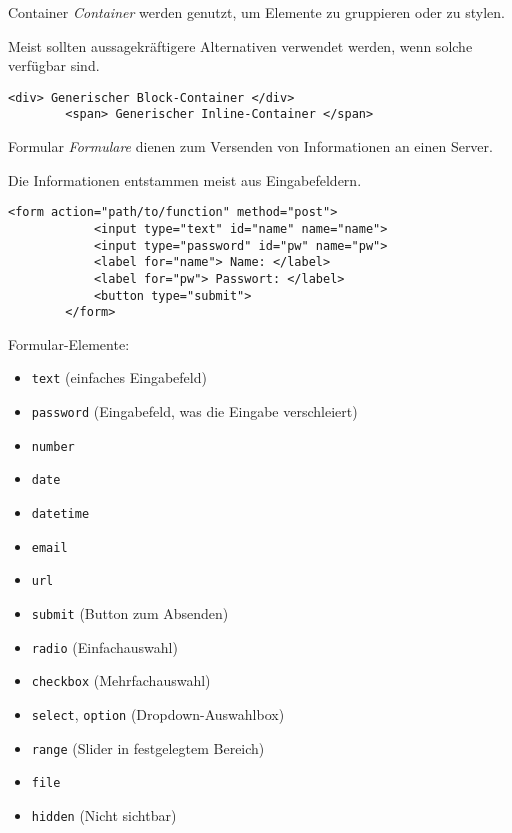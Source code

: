 \begin{bonus}{Container}
    \emph{Container} werden genutzt, um Elemente zu gruppieren oder zu stylen.

    Meist sollten aussagekräftigere Alternativen verwendet werden, wenn solche verfügbar sind.

    \begin{lstlisting}[language=html5]
        <div> Generischer Block-Container </div>
        <span> Generischer Inline-Container </span>
    \end{lstlisting}
\end{bonus}

\begin{bonus}{Formular}
    \emph{Formulare} dienen zum Versenden von Informationen an einen Server.

    Die Informationen entstammen meist aus Eingabefeldern.

    \begin{lstlisting}[language=html5]
        <form action="path/to/function" method="post">
            <input type="text" id="name" name="name">
            <input type="password" id="pw" name="pw">
            <label for="name"> Name: </label>
            <label for="pw"> Passwort: </label>
            <button type="submit">
        </form>
    \end{lstlisting}

    Formular-Elemente:
    \begin{itemize}
        \item \texttt{text} (einfaches Eingabefeld)
        \item \texttt{password} (Eingabefeld, was die Eingabe verschleiert)
        \item \texttt{number}
        \item \texttt{date}
        \item \texttt{datetime}
        \item \texttt{email}
        \item \texttt{url}
        \item \texttt{submit} (Button zum Absenden)
        \item \texttt{radio} (Einfachauswahl)
        \item \texttt{checkbox} (Mehrfachauswahl)
        \item \texttt{select}, \texttt{option} (Dropdown-Auswahlbox)
        \item \texttt{range} (Slider in festgelegtem Bereich)
        \item \texttt{file}
        \item \texttt{hidden} (Nicht sichtbar)
    \end{itemize}
\end{bonus}